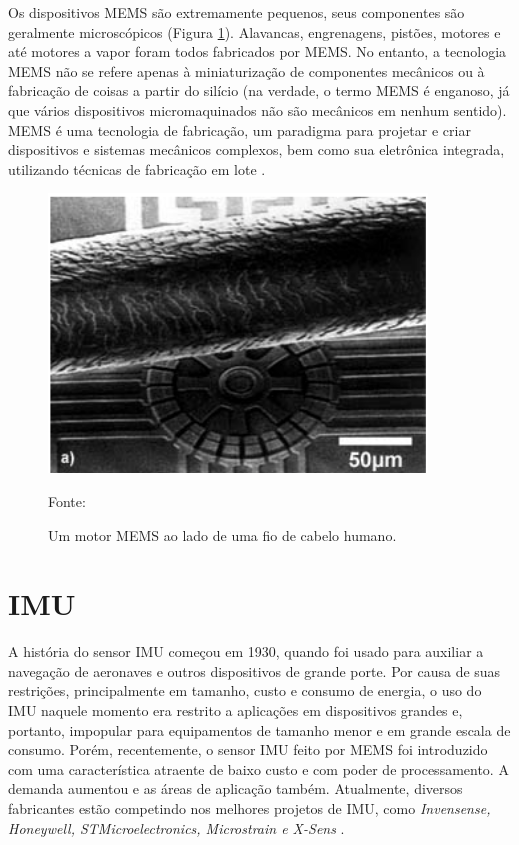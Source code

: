 		Os dispositivos MEMS são extremamente pequenos, seus componentes são geralmente microscópicos (Figura \ref{escala_mems}). Alavancas, engrenagens, pistões, motores e até motores a vapor foram todos fabricados por MEMS. No entanto, a tecnologia MEMS não se refere apenas à miniaturização de componentes mecânicos ou à fabricação de coisas a partir do silício (na verdade, o termo MEMS é enganoso, já que vários dispositivos micromaquinados não são mecânicos em nenhum sentido). MEMS é uma tecnologia de fabricação, um paradigma para projetar e criar dispositivos e sistemas mecânicos complexos, bem como sua eletrônica integrada, utilizando técnicas de fabricação em lote \cite{prime2002}.

		\begin{figure}[h]
			\centering
			\includegraphics[keepaspectratio=true,scale=0.5
			]{figuras/escala_mems.png}
			\caption{Um motor MEMS ao lado de uma fio de cabelo humano.}
			Fonte: \cite{prime2002}
			\label{escala_mems}
		\end{figure}

	\section{IMU}

		A história do sensor IMU começou em 1930, quando foi usado para auxiliar a navegação de aeronaves e outros dispositivos de grande porte. Por causa de suas restrições, principalmente em tamanho, custo e consumo de energia, o uso do IMU naquele momento era restrito a aplicações em dispositivos grandes e, portanto, impopular para equipamentos de tamanho menor e em grande escala de consumo. Porém, recentemente, o sensor IMU feito por MEMS foi introduzido com uma característica atraente de baixo custo e com poder de processamento. A demanda aumentou e as áreas de aplicação também. Atualmente, diversos fabricantes estão competindo nos melhores projetos de IMU, como \textit{Invensense, Honeywell, STMicroelectronics, Microstrain e X-Sens} \cite{ahmad2013}.
		

